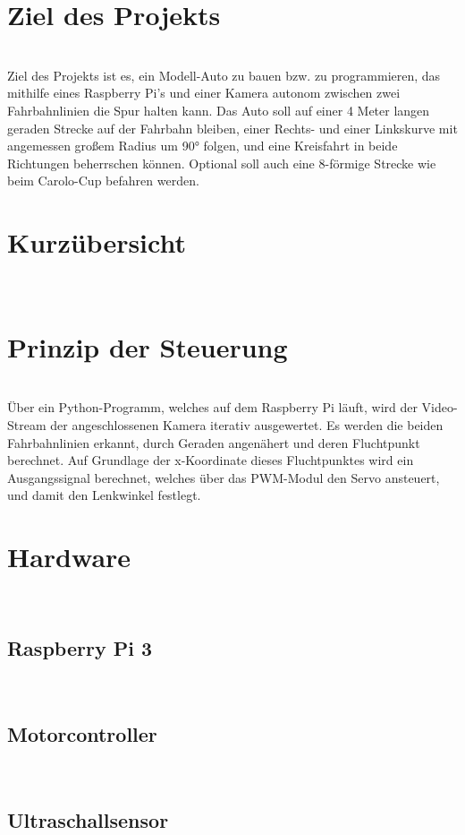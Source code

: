 \documentclass[a4paper,12pt]{article}
\begin{document}
  \section{Ziel des Projekts}
    \ \\
    
    Ziel des Projekts ist es, ein Modell-Auto zu bauen bzw. zu programmieren, das mithilfe eines Raspberry Pi's und einer Kamera autonom zwischen zwei Fahrbahnlinien die Spur halten kann. Das Auto soll auf einer 4 Meter langen geraden Strecke auf der Fahrbahn bleiben, einer Rechts- und einer Linkskurve mit angemessen großem Radius um 90° folgen, und eine Kreisfahrt in beide Richtungen beherrschen können. Optional soll auch eine 8-förmige Strecke wie beim Carolo-Cup befahren werden.
  
  \section{Kurzübersicht}
    \ \\
    
    
  \section{Prinzip der Steuerung}
  	\ \\
  	
  Über ein Python-Programm, welches auf dem Raspberry Pi läuft, wird der Video-Stream der angeschlossenen Kamera iterativ ausgewertet. Es werden die beiden Fahrbahnlinien erkannt, durch Geraden angenähert und deren Fluchtpunkt berechnet. Auf Grundlage der x-Koordinate dieses Fluchtpunktes wird ein Ausgangssignal berechnet, welches über das PWM-Modul den Servo ansteuert, und damit den Lenkwinkel festlegt.  
  	

  \section{Hardware}
    \ \\
    \subsection{Raspberry Pi 3}
    \ \\
    \subsection{Motorcontroller}
    \ \\
    \subsection{Ultraschallsensor}
    \ \\
\end{document}
